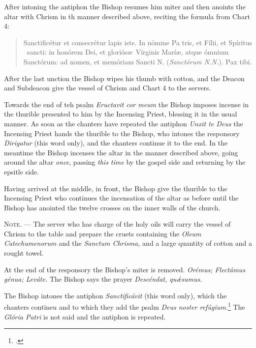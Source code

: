 \documentclass[letterpaper]{report}
\begin{document}
{After intoning the antiphon the Bishop resumes him miter and then anoints the
altar with Chrism in th manner described above, reciting the formula from Chart
4:

\begin{quote}
    Sancti\cross ficétur et conse\cross crétur lapis iste. In nómine Pa\cross
    tris, et Fí\cross lii, et Spíritus \cross\ sancti: in honórem Dei, et
    gloriós\ae\ Vírginis Marí\ae, atque ómnium Sanctórum: ad nomen, et memóriam
    Sancti N. (\textit{Sanctórum N.N.}). Pax tibi.
\end{quote}

After the last unction the Bishop wipes his thumb with cotton, and the Deacon
and Subdeacon give the vessel of Chrism and Chart 4 to the servers.

\rubric Towards the end of teh psalm \textit{Eructavit cor meum} the Bishop
imposes incense in the thurible presented to him by the Incensing Priest,
blessing it in the usual manner. As soon as the chanters have repeated the
antiphon \textit{Unxit te Deus} the Incensing Priest hands the thurible to the
Bishop, who intones the responsory \textit{Dirigatur} (this word only), and the
chanters continue it to the end. In the meantime the Bishop incenses the altar
in the manner described above, going around the altar \textit{once}, passing
\textit{this time} by the gospel side and returning by the epsitle side.

\rubric Having arrived at the middle, in front, the Bishop give the thurible to
the Incensing Priest who continues the incensation of the altar as before until
the Bishop has anointed the twelve crosses on the inner walls of the church.

\textsc{Note. ---} The server who has charge of the holy oils will carry the
vessel of Chrism to the table and prepare the cruets containing the
\textit{Oleum Catechumenorum} and the \textit{Sanctum Chrisma,} and a large
quantity of cotton and a rought towel.

\rubric At the end of the responsory the Bishop's miter is removed.
\textit{Orémus; Flectámus génua; Leváte.} The Bishop says the prayer
\textit{Descéndat, qu\'\ae sumus.}

\rubric The Bishop intones the antiphon \textit{Sanctificávit} (this word
only), which the chanters contineu and to which they add the psalm \textit{Deus
noster refúgium.}\footcite[The antiphon \textit{Sanctificávit Dóminus} may be
repeated after each verse of this psalm.][footnote 1, p. 108.]{consecranda} The
\textit{Glória Patri} is not said and the antiphon is repeated.

}
\end{document}

